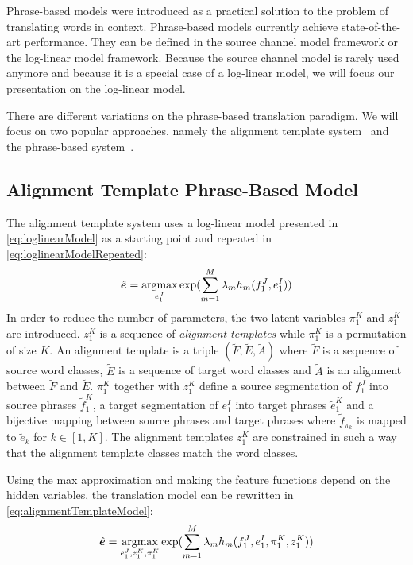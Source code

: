 Phrase-based models were introduced as a practical solution to the
problem of translating words in context. Phrase-based models
currently achieve state-of-the-art performance. They can be defined
in the source channel model framework or the log-linear model framework.
Because the source channel model is rarely used anymore and because it is
a special case of a log-linear model, we will focus our presentation
on the log-linear model.

There are different variations on the phrase-based translation paradigm.
We will focus on two popular approaches, namely the alignment template
system~\citep{och-tillmann-ney:1999:EMNLP,och-ney:2004:CL} and the phrase-based
system~\citep{koehn-och-marcu:2003:NAACL,koehn:2010:book}.

\subsection{Alignment Template Phrase-Based Model}

The alignment template system uses a log-linear model presented
in \autoref{eq:loglinearModel} as a starting point and repeated in
\autoref{eq:loglinearModelRepeated}:
%
\begin{equation}
  \hat{\bm{e}} = \operatorname*{argmax}_{e_1^J} \exp(\sum_{m = 1}^M \lambda_m h_m(f_1^J, e_1^I))
  \label{eq:loglinearModelRepeated}
\end{equation}
%
In order to reduce the number of parameters, the two latent variables $\pi_1^K$
and $z_1^K$ are introduced. $z_1^K$ is a sequence of \emph{alignment templates}
while $\pi_1^K$ is a permutation of size $K$. An alignment template
is a triple $(\tilde{F}, \tilde{E}, \tilde{A})$ where $\tilde{F}$ is a
sequence of source word classes, $\tilde{E}$ is a sequence of target
word classes and $\tilde{A}$ is an alignment between $\tilde{F}$
and $\tilde{E}$. $\pi_1^K$ together with $z_1^K$ define
a source segmentation of $f_1^J$ into source phrases $\tilde{f}_1^K$,
a target segmentation of $e_1^I$ into target phrases $\tilde{e}_1^K$ and
a bijective mapping between source phrases and target phrases where
$\tilde{f}_{\pi_k}$ is mapped to $\tilde{e}_{k}$ for $k \in [1,K]$.
The alignment templates $z_1^K$ are constrained in such a way that
the alignment template classes match the word classes.

Using the max approximation and making the feature
functions depend on the hidden variables, the translation model
can be rewritten in \autoref{eq:alignmentTemplateModel}:
%
\begin{equation}
  \hat{\bm{e}} = \operatorname*{argmax}_{e_1^J, z_1^K, \pi_1^K} \exp(\sum_{m = 1}^M \lambda_m h_m(f_1^J, e_1^I, \pi_1^K, z_1^K))
  \label{eq:alignmentTemplateModel}
\end{equation}
%

